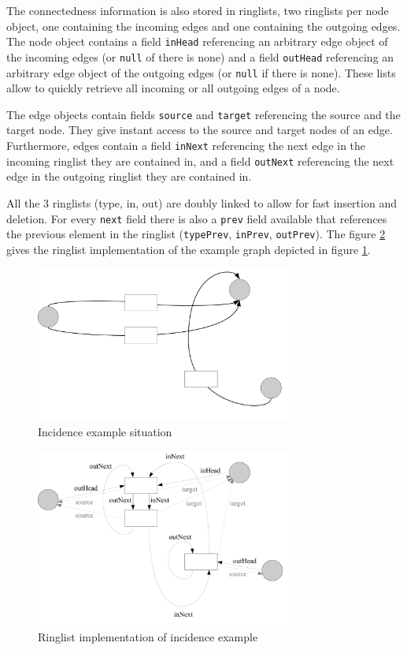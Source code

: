 The connectedness information is also stored in ringlists, two ringlists per node object,
one containing the incoming edges and one containing the outgoing edges.
The node object contains a field \texttt{inHead} referencing an arbitrary edge object of the incoming edges (or \texttt{null} of there is none) and a field \texttt{outHead} referencing an arbitrary edge object of the outgoing edges (or \texttt{null} if there is none).
These lists allow to quickly retrieve all incoming or all outgoing edges of a node.

The edge objects contain fields \texttt{source} and \texttt{target} referencing the source and the target node.
They give instant access to the source and target nodes of an edge.
Furthermore, edges contain a field \texttt{inNext} referencing the next edge in the incoming ringlist they are contained in, and a field \texttt{outNext} referencing the next edge in the outgoing ringlist they are contained in.

All the 3 ringlists (type, in, out) are doubly linked to allow for fast insertion and deletion.
For every \texttt{next} field there is also a \texttt{prev} field available that references the previous element in the ringlist (\texttt{typePrev}, \texttt{inPrev}, \texttt{outPrev}).
The figure \ref{figincidenceexampleringlists} gives the ringlist implementation of the example graph depicted in figure \ref{figincidenceexample}. 

\begin{figure}[htbp]
  \centering
  \includegraphics[width=0.75\textwidth]{fig/IncidenceExample}
  \caption{Incidence example situation}
  \label{figincidenceexample}
\end{figure}

\begin{figure}[htbp]
  \centering
  \includegraphics[width=0.75\textwidth]{fig/IncidenceExampleRinglists}
  \caption{Ringlist implementation of incidence example}
  \label{figincidenceexampleringlists}
\end{figure}


